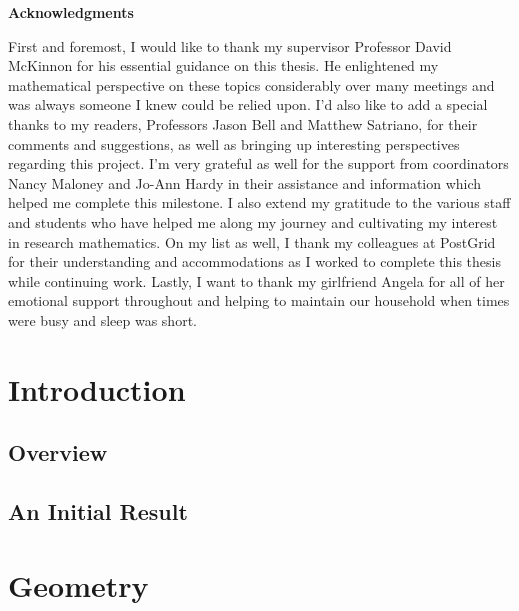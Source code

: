 \documentclass[12pt, leqno]{article}
\begin{document}
\newpage
\begin{center}
    \textbf{Acknowledgments}
\end{center}

First and foremost, I would like to thank my supervisor Professor David McKinnon for his essential guidance on this thesis.
He enlightened my mathematical perspective on these topics considerably over many meetings and was always someone I knew could be relied upon. 
I'd also like to add a special thanks to my readers, 
Professors Jason Bell and Matthew Satriano,
for their comments and suggestions,
as well as bringing up interesting perspectives regarding this project.
I'm very grateful as well for the support from coordinators Nancy Maloney and Jo-Ann Hardy in their assistance and information which helped me complete this milestone.
I also extend my gratitude to the various staff and students who have helped me along my journey and cultivating my interest in research mathematics.
On my list as well, I thank my colleagues at PostGrid for their understanding and accommodations as I worked to complete this thesis while continuing work.
Lastly, I want to thank my girlfriend Angela for all of her emotional support throughout and helping to maintain our household when times were busy and sleep was short.



\newpage
\tableofcontents
\setcounter{page}{5}


\newpage
{}
\setcounter{page}{1}

\section{Introduction}

\subsection{Overview}
\let\clearpage\relax

\subsection{An Initial Result}
\let\clearpage\relax

\newpage
\section{Geometry}
\end{document}
